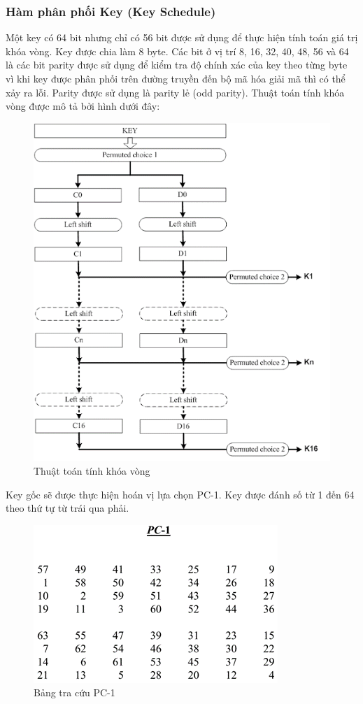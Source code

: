 \subsubsection{Hàm phân phối Key (Key Schedule)}
Một key có 64 bit nhưng chỉ có 56 bit được sử dụng để thực hiện tính toán giá trị khóa vòng. Key được chia làm 8 byte. Các bit ở vị trí 8, 16, 32, 40, 48, 56 và 64 là các bit parity được sử dụng để kiểm tra độ chính xác của key theo từng byte vì khi key được phân phối trên đường truyền đến bộ mã hóa giải mã thì có thể xảy ra lỗi. Parity được sử dụng là parity lẻ (odd parity). Thuật toán tính khóa vòng được mô tả bởi hình dưới đây:
\begin{figure}[H]
	\centering
	\includegraphics[scale=0.7]{"Ảnh/hiền/khóa k"}
	\caption{Thuật toán tính khóa vòng}
	\label{fig:khoa-k}
\end{figure}
Key gốc sẽ được thực hiện hoán vị lựa chọn PC-1. Key được đánh số từ 1 đến 64 theo thứ tự từ trái qua phải.
\begin{figure}[H]
    \centering
    \includegraphics{Ảnh/hiền/pc-1.png}
    \caption{Bảng tra cứu PC-1}
\end{figure}
